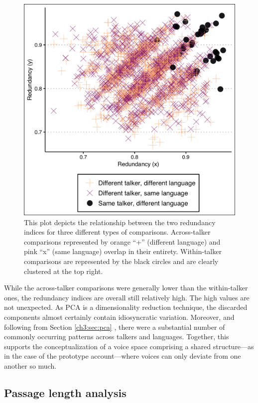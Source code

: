 \begin{figure}[ht]
    \begin{center}
    \includegraphics[width=0.9\linewidth]{figures/ch3_redundancy.png} 
    \caption{This plot depicts the relationship between the two redundancy indices for three different types of comparisons. Across-talker comparisons represented by orange ``+'' (different language) and pink ``x'' (same language) overlap in their entirety. Within-talker comparisons are represented by the black circles and are clearly clustered at the top right.}
    \label{ch3:fig:redundancy}
    \end{center}
    \end{figure}

While the across-talker comparisons were generally lower than the within-talker ones, the redundancy indices are overall still relatively high. The high values are not unexpected. As PCA is a dimensionality reduction technique, the discarded components almost certainly contain idiosyncratic variation. Moreover, and following from Section \ref{ch3:sec:pca} , there were a substantial number of commonly occurring patterns across talkers and languages. Together, this supports the conceptualization of a voice space comprising a shared structure---as in the case of the prototype account---where voices can only deviate from one another so much.

\subsection{Passage length analysis}\label{ch3:sec:passagelength}

